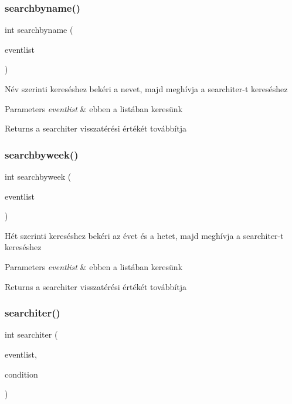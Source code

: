 \subsubsection{\texorpdfstring{searchbyname()}{searchbyname()}}
{\footnotesize\ttfamily int searchbyname (\begin{DoxyParamCaption}\item[{\hyperlink{struct_event_list}{Event\+List} $\ast$}]{eventlist }\end{DoxyParamCaption})}

Név szerinti kereséshez bekéri a nevet, majd meghívja a searchiter-\/t kereséshez 
\begin{DoxyParams}{Parameters}
{\em eventlist} & ebben a listában keresünk \\
\hline
\end{DoxyParams}
\begin{DoxyReturn}{Returns}
a searchiter visszatérési értékét továbbítja 
\end{DoxyReturn}
\mbox{\label{group__search_ga6b219250779d3af5972611513010a013}} 
\subsubsection{\texorpdfstring{searchbyweek()}{searchbyweek()}}
{\footnotesize\ttfamily int searchbyweek (\begin{DoxyParamCaption}\item[{\hyperlink{struct_event_list}{Event\+List} $\ast$}]{eventlist }\end{DoxyParamCaption})}

Hét szerinti kereséshez bekéri az évet és a hetet, majd meghívja a searchiter-\/t kereséshez 
\begin{DoxyParams}{Parameters}
{\em eventlist} & ebben a listában keresünk \\
\hline
\end{DoxyParams}
\begin{DoxyReturn}{Returns}
a searchiter visszatérési értékét továbbítja 
\end{DoxyReturn}
\mbox{\label{group__search_ga199722ea7869f598848648238f88d274}} 
\subsubsection{\texorpdfstring{searchiter()}{searchiter()}}
{\footnotesize\ttfamily int searchiter (\begin{DoxyParamCaption}\item[{\hyperlink{struct_event_list}{Event\+List} $\ast$}]{eventlist,  }\item[{\hyperlink{struct_search_conditions}{Search\+Conditions}}]{condition }\end{DoxyParamCaption})}

